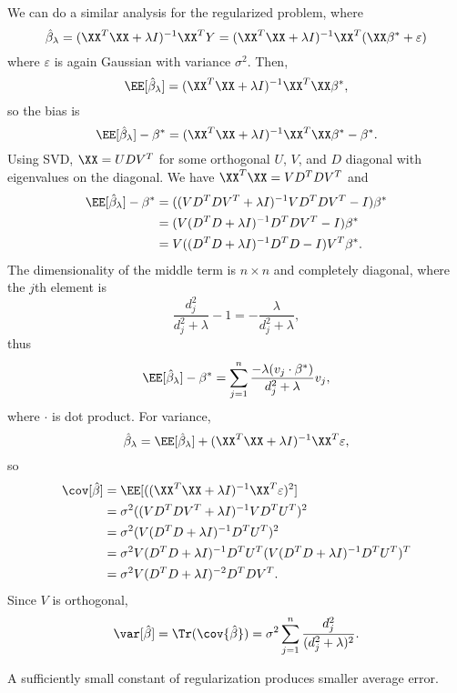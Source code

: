 We can do a similar analysis for the regularized problem, where
\[\hat{\beta}_{\lambda} = (\XX^T\XX + \lambda I)^{-1}\XX^TY = (\XX^T\XX + \lambda I)^{-1}\XX^T(\XX \beta^* + \varepsilon)\] 
where $\varepsilon$ is again Gaussian with variance $\sigma^2$. Then, 
\[\EE[\hat{\beta}_{\lambda}] = (\XX^T\XX + \lambda I)^{-1}\XX^T\XX\beta^*,\] 
so the bias is 
\[\EE[\hat{\beta}_{\lambda}] - \beta^* = (\XX^T\XX + \lambda I)^{-1}\XX^T\XX\beta^* - \beta^*.\]
Using SVD, $\XX = UDV^T$ for some orthogonal $U$, $V$, and $D$ diagonal with eigenvalues on the diagonal. We have $\XX^T\XX = VD^TDV^T$ and   
\begin{align*}
	\EE[\hat{\beta}_{\lambda}] - \beta^* &= ((VD^TDV^T + \lambda I)^{-1}VD^TDV^T - I)\beta^* \\
																			 &= (V(D^TD + \lambda I)^{-1}D^TDV^T - I)\beta^* \\
																			 &= V((D^TD + \lambda I)^{-1}D^TD - I)V^T\beta^*.
\end{align*}
The dimensionality of the middle term is $n\times n$ and completely diagonal, where the $j$th element is 
\[\frac{d_j^2}{d_j^2 + \lambda} - 1 = -\frac{\lambda}{d_j^2 + \lambda},\]
thus 
\[\EE[\hat{\beta}_{\lambda}] - \beta^* = \sum_{j=1}^n \frac{-\lambda (v_j\cdot \beta^*)}{d_j^2 + \lambda}v_j,\]
where $\cdot$ is dot product. For variance, 
\[\hat{\beta}_{\lambda} = \EE[\hat{\beta}_{\lambda}] + (\XX^T\XX + \lambda I)^{-1}\XX^T\varepsilon,\]
so 
\begin{align*}
	\cov[\hat{\beta}] &= \EE[((\XX^T\XX + \lambda I)^{-1}\XX^T\varepsilon)^2] \\
										&= \sigma^2((VD^TDV^T+\lambda I)^{-1}VD^TU^T)^2 \\
										&= \sigma^2(V(D^TD+\lambda I)^{-1}D^TU^T)^2 \\
										&= \sigma^2V(D^TD+\lambda I)^{-1}D^TU^T (V(D^TD+\lambda I)^{-1}D^TU^T)^T \\
										&= \sigma^2V(D^TD+\lambda I)^{-2}D^TDV^T.
\end{align*}
Since $V$ is orthogonal, 
\[ \var[\hat{\beta}] = \Tr(\cov{\hat{\beta}}) = \sigma^2\sum_{j=1}^n \frac{d_j^2}{(d_j^2 + \lambda)^2}.\]

\begin{example}
\exlabel

A sufficiently small constant of regularization produces smaller average error. 
\end{example}

